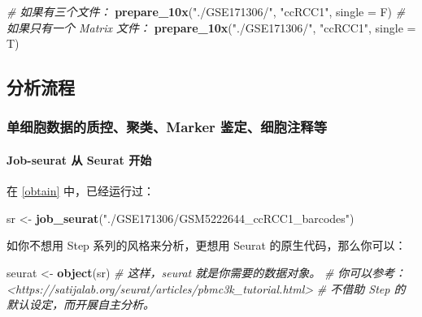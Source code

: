 \documentclass[
]{article}
\newenvironment{Shaded}{\begin{snugshade}}{\end{snugshade}}
\newcommand{\CommentTok}[1]{\textcolor[rgb]{0.56,0.35,0.01}{\textit{#1}}}
\newcommand{\DataTypeTok}[1]{\textcolor[rgb]{0.13,0.29,0.53}{#1}}
\newcommand{\KeywordTok}[1]{\textcolor[rgb]{0.13,0.29,0.53}{\textbf{#1}}}
\newcommand{\NormalTok}[1]{#1}
\newcommand{\StringTok}[1]{\textcolor[rgb]{0.31,0.60,0.02}{#1}}
\begin{document}
\begin{Shaded}
\begin{Highlighting}[]
\CommentTok{\# 如果有三个文件：}
\KeywordTok{prepare\_10x}\NormalTok{(}\StringTok{"./GSE171306/"}\NormalTok{, }\StringTok{"ccRCC1"}\NormalTok{, }\DataTypeTok{single =}\NormalTok{ F)}
\CommentTok{\# 如果只有一个 Matrix 文件：}
\KeywordTok{prepare\_10x}\NormalTok{(}\StringTok{"./GSE171306/"}\NormalTok{, }\StringTok{"ccRCC1"}\NormalTok{, }\DataTypeTok{single =}\NormalTok{ T)}
\end{Highlighting}
\end{Shaded}

\hypertarget{ux5206ux6790ux6d41ux7a0b}{%
\subsection{分析流程}\label{ux5206ux6790ux6d41ux7a0b}}

\hypertarget{ux5355ux7ec6ux80deux6570ux636eux7684ux8d28ux63a7ux805aux7c7bmarker-ux9274ux5b9aux7ec6ux80deux6ce8ux91caux7b49}{%
\subsubsection{单细胞数据的质控、聚类、Marker 鉴定、细胞注释等}\label{ux5355ux7ec6ux80deux6570ux636eux7684ux8d28ux63a7ux805aux7c7bmarker-ux9274ux5b9aux7ec6ux80deux6ce8ux91caux7b49}}

\hypertarget{job-seurat-ux4ece-seurat-ux5f00ux59cb}{%
\paragraph{Job-seurat 从 Seurat 开始}\label{job-seurat-ux4ece-seurat-ux5f00ux59cb}}

在 \ref{obtain} 中，已经运行过：

\begin{Shaded}
\begin{Highlighting}[]
\NormalTok{sr \textless{}{-}}\StringTok{ }\KeywordTok{job\_seurat}\NormalTok{(}\StringTok{"./GSE171306/GSM5222644\_ccRCC1\_barcodes"}\NormalTok{)}
\end{Highlighting}
\end{Shaded}

如你不想用 Step 系列的风格来分析，更想用 Seurat 的原生代码，那么你可以：

\begin{Shaded}
\begin{Highlighting}[]
\NormalTok{seurat \textless{}{-}}\StringTok{ }\KeywordTok{object}\NormalTok{(sr)}
\CommentTok{\# 这样，\textasciigrave{}seurat\textasciigrave{} 就是你需要的数据对象。}
\CommentTok{\# 你可以参考：\textless{}https://satijalab.org/seurat/articles/pbmc3k\_tutorial.html\textgreater{}}
\CommentTok{\# 不借助 Step 的默认设定，而开展自主分析。}
\end{Highlighting}
\end{Shaded}
\end{document}
